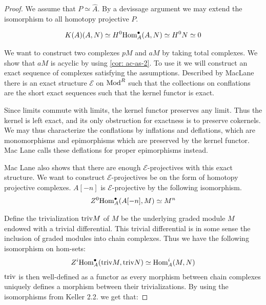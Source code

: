 \documentclass[../thesis.tex]{subfiles}
\begin{document}
            \begin{proof}
                We assume that $P \simeq \hat{A}$. By a devissage argument we may extend the isomorphism to all homotopy projective $P$. 

                \begin{align*}
                    K(A)(A, N) \simeq H^0 {\tt{Hom}}^\bullet_A (A, N) \simeq H^0 N \simeq 0
                \end{align*}

                We want to construct two complexes $pM$ and $aM$ by taking total complexes. We show that $aM$ is acyclic by using \ref{cor: ac-as-2}. To use it we will construct an exact sequence of complexes satisfying the assumptions. Described by MacLane \cite{MacLane94} there is an exact structure $\mathcal{E}$ on $\tt{Mod}^R$ such that the collections on conflations are the short exact sequences such that the kernel functor is exact.
                \begin{center}
                \end{center}

                Since limits commute with limits, the kernel functor preserves any limit. Thus the kernel is left exact, and its only obstruction for exactness is to preserve cokernels. We may thus characterize the conflations by inflations and deflations, which are monomorphisms and epimorphisms which are preserved by the kernel functor. Mac Lane calls these deflations for proper epimorphisms instead.

                Mac Lane also shows that there are enough $\mathcal{E}$-projectives with this exact structure. We want to construct $\mathcal{E}$-projectives be on the form of homotopy projective complexes. $A[-n]$ is $\mathcal{E}$-projective by the following isomorphism.
                \begin{align*}
                    Z^0\tt{Hom}_A^\bullet (A[-n], M) \simeq M^n
                \end{align*}

                Define the trivialization $\tt{triv}M$ of $M$ be the underlying graded module $M$ endowed with a trivial differential. This trivial differential is in some sense the inclusion of graded modules into chain complexes. Thus we have the following isomorphism on hom-sets:
                \begin{align*}
                    Z^i\tt{Hom}_A^\bullet(\tt{triv}M, \tt{triv}N) \simeq \tt{Hom}_A^i(M, N)
                \end{align*}
                $\tt{triv}$ is then well-defined as a functor as every morphism between chain complexes uniquely defines a morphism between their trivializations. By using the isomorphisms from Keller \cite{Keller94} 2.2. we get that:


\end{proof}
\end{document}
